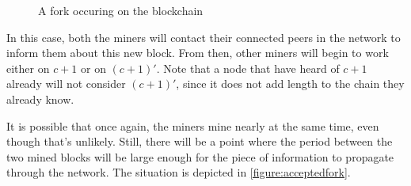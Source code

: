 \documentclass[11pt]{report}
\begin{document}
                \begin{figure}[ht]
                    \centering
                    \caption{A fork occuring on the blockchain}
                    \label{figure:fork}
                \end{figure}
                
                In this case, both the miners will contact their connected peers in the network to inform them about this new block. From then, other miners will begin to work either on \(c+1\) or on \((c+1)'\). Note that a node that have heard of \(c+1\) already will not consider \((c+1)'\), since it does not add length to the chain they already know.
                
                It is possible that once again, the miners mine nearly at the same time, even though that's unlikely. Still, there will be a point where the period between the two mined blocks will be large enough for the piece of information to propagate through the network. The situation is depicted in \autoref{figure:acceptedfork}.
                
\end{document}
